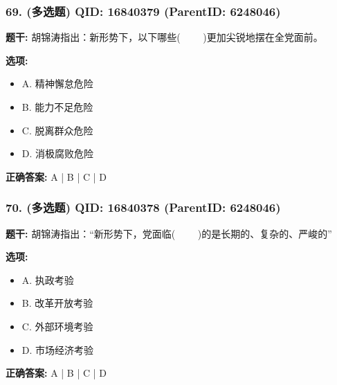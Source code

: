 \documentclass[12pt,UTF8]{ctexart}
\begin{document}
\subsubsection*{69. (多选题) \small QID: 16840379 (ParentID: 6248046)}

\textbf{题干:}
胡锦涛指出：新形势下，以下哪些(     )更加尖锐地摆在全党面前。



\textbf{选项:}
\begin{itemize}[leftmargin=*]

  \item A. 精神懈怠危险

  \item B. 能力不足危险

  \item C. 脱离群众危险

  \item D. 消极腐败危险

\end{itemize}

\textbf{正确答案:}
A | B | C | D

\vspace{0.3em}\hrulefill\vspace{0.7em}

\subsubsection*{70. (多选题) \small QID: 16840378 (ParentID: 6248046)}

\textbf{题干:}
胡锦涛指出：“新形势下，党面临(     )的是长期的、复杂的、严峻的”



\textbf{选项:}
\begin{itemize}[leftmargin=*]

  \item A. 执政考验

  \item B. 改革开放考验

  \item C. 外部环境考验

  \item D. 市场经济考验

\end{itemize}

\textbf{正确答案:}
A | B | C | D

\vspace{0.3em}\hrulefill\vspace{0.7em}
\end{document}
